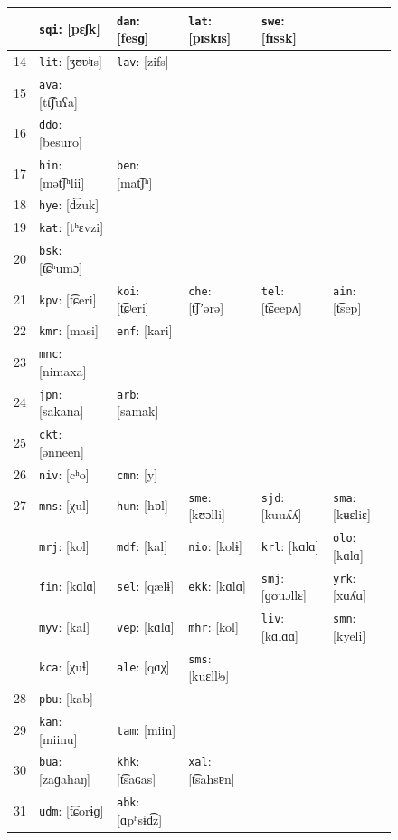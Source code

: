 \begin{figure}[p!]
\begin{tabular}{clllll}
& \texttt{sqi}: [pɛʃk] & \texttt{dan}: [fesɡ] & \texttt{lat}: [pɪskɪs] & \texttt{swe}: [fɪssk] &\\
\hline
14 & \texttt{lit}: [ʒʊʋʲɪs] & \texttt{lav}: [zifs] & & &\\
\hline
15 & \texttt{ava}: [tt͡ʃuʕa] & & & &\\
\hline
16 & \texttt{ddo}: [besuro] & & & &\\
\hline
17 & \texttt{hin}: [mət͡ʃʰlii] & \texttt{ben}: [mat͡ʃʰ] & & &\\
\hline
18 & \texttt{hye}: [d͡zuk] & & & &\\
\hline
19 & \texttt{kat}: [tʰɛvzi] & & & &\\
\hline
20 & \texttt{bsk}: [t͡ɕʰumɔ] & & & &\\
\hline
21 & \texttt{kpv}: [t͡ɕeri] & \texttt{koi}: [t͡ɕʲeri] & \texttt{che}: [t͡ʃʼərə] & \texttt{tel}: [t͡ɕeepʌ] & \texttt{ain}: [t͡sep]\\
\hline
22 & \texttt{kmr}: [masi] & \texttt{enf}: [kari] & & &\\
\hline
23 & \texttt{mnc}: [nimaxa] & & & &\\
\hline
24 & \texttt{jpn}: [sakana] & \texttt{arb}: [samak] & & &\\
\hline
25 & \texttt{ckt}: [ənneen] & & & &\\
\hline
26 & \texttt{niv}: [cʰo] & \texttt{cmn}: [y] & & &\\
\hline
27 & \texttt{mns}: [χul] & \texttt{hun}: [hɒl] & \texttt{sme}: [kʊɔlli] & \texttt{sjd}: [kuuʎʎ] & \texttt{sma}: [kʉɛliɛ]\\
& \texttt{mrj}: [kol] & \texttt{mdf}: [kal] & \texttt{nio}: [kolɨ] & \texttt{krl}: [kɑlɑ] & \texttt{olo}: [kɑlɑ]\\
& \texttt{fin}: [kɑlɑ] & \texttt{sel}: [qælɨ] & \texttt{ekk}: [kɑlɑ] & \texttt{smj}: [ɡʊuɔllɛ] & \texttt{yrk}: [xɑʎɑ]\\
& \texttt{myv}: [kal] & \texttt{vep}: [kɑlɑ] & \texttt{mhr}: [kol] & \texttt{liv}: [kɑlɑɑ] & \texttt{smn}: [kyeli]\\
& \texttt{kca}: [χuɬ] & \texttt{ale}: [qɑχ] & \texttt{sms}: [kuɛllʲɘ] & \\
\hline
28 & \texttt{pbu}: [kab] & & & &\\
\hline
29 & \texttt{kan}: [miinu] & \texttt{tam}: [miin] & & &\\
\hline
30 & \texttt{bua}: [zaɡahaŋ] & \texttt{khk}: [t͡saɢas] & \texttt{xal}: [t͡saħsɐn] & &\\
\hline
31 & \texttt{udm}: [t͡ɕorɨɡ] & \texttt{abk}: [ɑpʰsɨd͡z] & & &\\

\end{tabular}
\end{figure}

